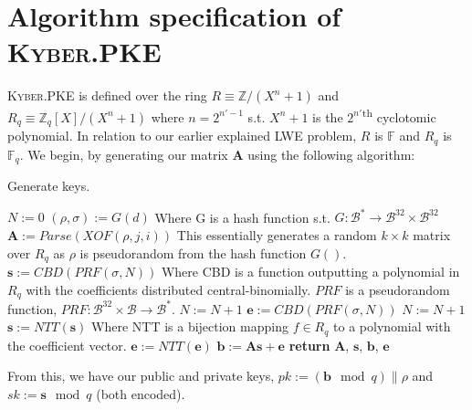 \documentclass[a4paper, 10pt]{article}
\theoremstyle{definition}
\begin{document}
\newpage

\section{Algorithm specification of \textsc{Kyber}.PKE}

\textsc{Kyber}.PKE is defined over the ring $R \equiv \mathbb{Z} /(X^n+1)$ and $R_q\equiv \mathbb{Z}_q[X]/(X^n+1)$ where $n=2^{n'-1}$ s.t. $X^{n}+1$ is the $2^{n'}$\textsuperscript{th} cyclotomic polynomial\cite{crystals}. In relation to our earlier explained LWE problem, $R$ is $\mathbb{F}$ and $R_q$ is $\mathbb{F}_q$. We begin, by generating our matrix $\mathbf{A}$ using the following algorithm:
\begin{algorithm}[H]
    \caption{Generate keys.}
    \begin{algorithmic}
    \State $N:=0$
    \State $(\rho, \sigma ):=G(d)$ \Comment Where G is a hash function s.t. $G:\mathcal{B}^* \rightarrow \mathcal{B}^{32}\times  \mathcal{B}^{32}$
            \State $\mathbf{A}:=Parse(XOF(\rho , j, i))$ \Comment This essentially generates a random $k\times k$ matrix over $R_q$ as $\rho$ is pseudorandom from the hash function $G()$.
        \EndFor
    \EndFor
        \State $\mathbf{s}:=CBD(PRF(\sigma ,N))$ \Comment Where CBD is a function outputting a polynomial in $R_q$ with the coefficients distributed central-binomially. $PRF$ is a pseudorandom function, $PRF:\mathcal{B}^{32} \times \mathcal{B} \rightarrow \mathcal{B}^*$.
        \State $N:=N+1$
    \EndFor
        \State $\mathbf{e}:=CBD(PRF(\sigma ,N))$
        \State $N:=N+1$
    \EndFor
    \State $\mathbf{s}:= NTT(\mathbf{s})$ \Comment Where NTT is a bijection mapping $f \in R_q$ to a polynomial with the coefficient vector.
    \State $\mathbf{e}:= NTT(\mathbf{e})$
    \State $\mathbf{b}:=\mathbf{As}+\mathbf{e}$
    \State \textbf{return} $\mathbf{A}$, $\mathbf{s}$, $\mathbf{b}$, $\mathbf{e}$
    \end{algorithmic}
\end{algorithm}

From this, we have our public and private keys, $pk:=(\mathbf{b}\mod{q})\| \rho $ and $sk:=\mathbf{s}\mod{q}$ (both encoded).
\end{document}
